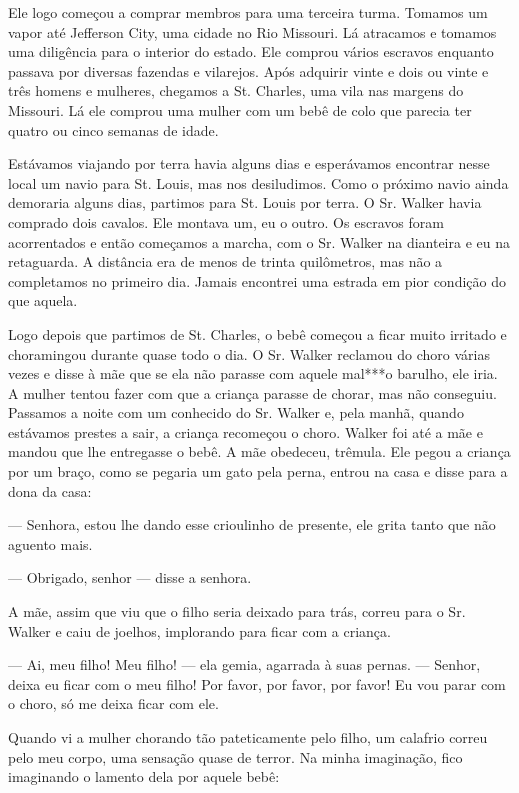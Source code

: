 Ele logo começou a comprar membros para uma terceira turma. Tomamos um
vapor até Jefferson City, uma cidade no Rio Missouri. Lá atracamos e
tomamos uma diligência para o interior do estado. Ele comprou vários
escravos enquanto passava por diversas fazendas e vilarejos. Após
adquirir vinte e dois ou vinte e três homens e mulheres, chegamos a St.
Charles, uma vila nas margens do Missouri. Lá ele comprou uma mulher com
um bebê de colo que parecia ter quatro ou cinco semanas de idade.

Estávamos viajando por terra havia alguns dias e esperávamos encontrar
nesse local um navio para St. Louis, mas nos desiludimos. Como o próximo
navio ainda demoraria alguns dias, partimos para St. Louis por terra. O
Sr. Walker havia comprado dois cavalos. Ele montava um, eu o outro. Os
escravos foram acorrentados e então começamos a marcha, com o Sr. Walker
na dianteira e eu na retaguarda. A distância era de menos de trinta
quilômetros, mas não a completamos no primeiro dia. Jamais encontrei uma
estrada em pior condição do que aquela.

Logo depois que partimos de St. Charles, o bebê começou a ficar muito
irritado e choramingou durante quase todo o dia. O Sr. Walker reclamou
do choro várias vezes e disse à mãe que se ela não parasse com aquele
mal***o barulho, ele iria. A mulher tentou fazer com que a criança
parasse de chorar, mas não conseguiu. Passamos a noite com um conhecido
do Sr. Walker e, pela manhã, quando estávamos prestes a sair, a criança
recomeçou o choro. Walker foi até a mãe e mandou que lhe entregasse o
bebê. A mãe obedeceu, trêmula. Ele pegou a criança por um braço, como se
pegaria um gato pela perna, entrou na casa e disse para a dona da casa:

--- Senhora, estou lhe dando esse crioulinho de presente, ele grita
tanto que não aguento mais.

--- Obrigado, senhor --- disse a senhora.

A mãe, assim que viu que o filho seria deixado para trás, correu para o
Sr. Walker e caiu de joelhos, implorando para ficar com a criança.

--- Ai, meu filho! Meu filho! --- ela gemia, agarrada à suas pernas. ---
Senhor, deixa eu ficar com o meu filho! Por favor, por favor, por favor!
Eu vou parar com o choro, só me deixa ficar com ele.

Quando vi a mulher chorando tão pateticamente pelo filho, um calafrio
correu pelo meu corpo, uma sensação quase de terror. Na minha
imaginação, fico imaginando o lamento dela por aquele bebê:

